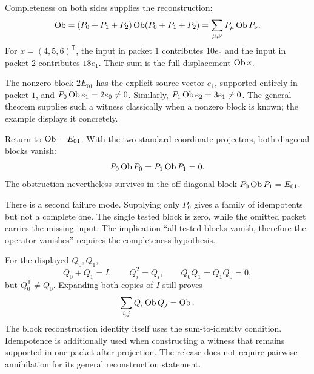 
Completeness on both sides supplies the reconstruction:
\[
\operatorname{Ob}=(P_0+P_1+P_2)\operatorname{Ob}(P_0+P_1+P_2)
=\sum_{\mu,\nu}P_\mu\operatorname{Ob} P_\nu.
\]
For $x=(4,5,6)^\mathsf T$, the input in packet $1$ contributes $10e_0$ and the input in packet $2$ contributes $18e_1$. Their sum is the full displacement $\operatorname{Ob} x$.

The nonzero block $2E_{01}$ has the explicit source vector $e_1$, supported entirely in packet $1$, and $P_0\operatorname{Ob} e_1=2e_0\ne0$. Similarly, $P_1\operatorname{Ob} e_2=3e_1\ne0$. The general theorem supplies such a witness classically when a nonzero block is known; the example displays it concretely.


Return to $\operatorname{Ob}=E_{01}$. With the two standard coordinate projectors, both diagonal blocks vanish:
\[
P_0\operatorname{Ob} P_0=P_1\operatorname{Ob} P_1=0.
\]
The obstruction nevertheless survives in the off-diagonal block $P_0\operatorname{Ob} P_1=E_{01}$.


There is a second failure mode. Supplying only $P_0$ gives a family of idempotents but not a complete one. The single tested block is zero, while the omitted packet carries the missing input. The implication ``all tested blocks vanish, therefore the operator vanishes'' requires the completeness hypothesis.

For the displayed $Q_0,Q_1$,
\[
Q_0+Q_1=I,\qquad Q_i^2=Q_i,\qquad Q_0Q_1=Q_1Q_0=0,
\]
but $Q_0^\mathsf T\ne Q_0$. Expanding both copies of $I$ still proves
\[
\sum_{i,j}Q_i\operatorname{Ob} Q_j=\operatorname{Ob}.
\]
The block reconstruction identity itself uses the sum-to-identity condition. Idempotence is additionally used when constructing a witness that remains supported in one packet after projection. The release does not require pairwise annihilation for its general reconstruction statement.

